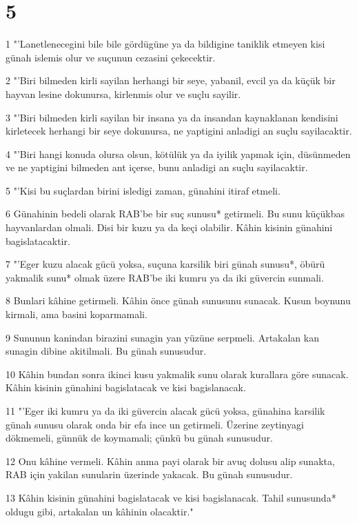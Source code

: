 \chapter{5}

\par 1 "'Lanetlenecegini bile bile gördügüne ya da bildigine taniklik etmeyen kisi günah islemis olur ve suçunun cezasini çekecektir.
\par 2 "'Biri bilmeden kirli sayilan herhangi bir seye, yabanil, evcil ya da küçük bir hayvan lesine dokunursa, kirlenmis olur ve suçlu sayilir.
\par 3 "'Biri bilmeden kirli sayilan bir insana ya da insandan kaynaklanan kendisini kirletecek herhangi bir seye dokunursa, ne yaptigini anladigi an suçlu sayilacaktir.
\par 4 "'Biri hangi konuda olursa olsun, kötülük ya da iyilik yapmak için, düsünmeden ve ne yaptigini bilmeden ant içerse, bunu anladigi an suçlu sayilacaktir.
\par 5 "'Kisi bu suçlardan birini isledigi zaman, günahini itiraf etmeli.
\par 6 Günahinin bedeli olarak RAB'be bir suç sunusu* getirmeli. Bu sunu küçükbas hayvanlardan olmali. Disi bir kuzu ya da keçi olabilir. Kâhin kisinin günahini bagislatacaktir.
\par 7 "'Eger kuzu alacak gücü yoksa, suçuna karsilik biri günah sunusu*, öbürü yakmalik sunu* olmak üzere RAB'be iki kumru ya da iki güvercin sunmali.
\par 8 Bunlari kâhine getirmeli. Kâhin önce günah sunusunu sunacak. Kusun boynunu kirmali, ama basini koparmamali.
\par 9 Sununun kanindan birazini sunagin yan yüzüne serpmeli. Artakalan kan sunagin dibine akitilmali. Bu günah sunusudur.
\par 10 Kâhin bundan sonra ikinci kusu yakmalik sunu olarak kurallara göre sunacak. Kâhin kisinin günahini bagislatacak ve kisi bagislanacak.
\par 11 "'Eger iki kumru ya da iki güvercin alacak gücü yoksa, günahina karsilik günah sunusu olarak onda bir efa ince un getirmeli. Üzerine zeytinyagi dökmemeli, günnük de koymamali; çünkü bu günah sunusudur.
\par 12 Onu kâhine vermeli. Kâhin anma payi olarak bir avuç dolusu alip sunakta, RAB için yakilan sunularin üzerinde yakacak. Bu günah sunusudur.
\par 13 Kâhin kisinin günahini bagislatacak ve kisi bagislanacak. Tahil sunusunda* oldugu gibi, artakalan un kâhinin olacaktir."
